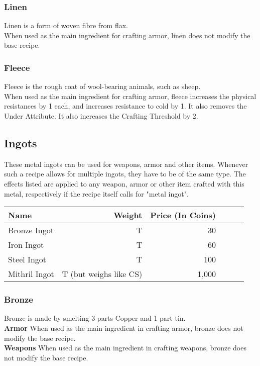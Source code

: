 \subsubsection{Linen}
Linen is a form of woven fibre from flax.\\
When used as the main ingredient for crafting armor, linen does not modify the base recipe.

\subsubsection{Fleece}
Fleece is the rough coat of wool-bearing animals, such as sheep.\\
When used as the main ingredient for crafting armor, fleece increases the physical resistances by 1 each, and increases resistance to cold by 1.
It also removes the Under Attribute.
It also increases the Crafting Threshold by 2.

\subsection{Ingots}\label{subsec:ingots}
These metal ingots can be used for weapons, armor and other items.
Whenever such a recipe allows for multiple ingots, they have to be of the same type.
The effects listed are applied to any weapon, armor or other item crafted with this metal, respectively if the recipe itself calls for "metal ingot".
\begin{longtable}{l | r | r | p{2cm} | p{2cm} | p{2cm}}
	Name & Weight & Price (In Coins)\\ \hline
	Bronze Ingot & T & 30 \\
	Iron Ingot & T & 60 \\
	Steel Ingot & T & 100 \\
	Mithril  Ingot & T (but weighs like CS) & 1,000\\
\end{longtable}

\subsubsection{Bronze}
Bronze is made by smelting 3 parts Copper and 1 part tin.\\
\textbf{Armor}
When used as the main ingredient in crafting armor, bronze does not modify the base recipe.\\
\textbf{Weapons}
When used as the main ingredient in crafting weapons, bronze does not modify the base recipe.

